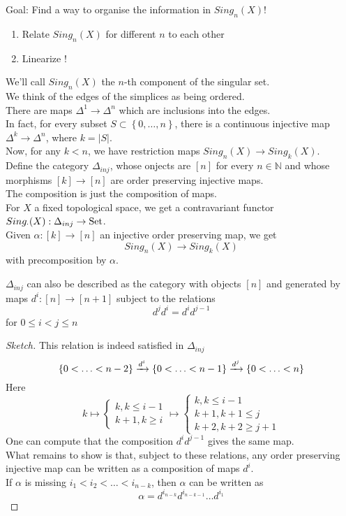 \documentclass[../main.tex]{subfiles}
\begin{document}
Goal: Find a way to organise the information in $Sing_n( X) $!
\begin{enumerate}
\item Relate $Sing_n( X) $ for different $n$ to each other
\item Linearize !
\end{enumerate}
We'll call $Sing_n( X) $ the $n$-th component of the singular set.\\
We think of the edges of the simplices as being ordered.\\
There are maps $\Delta^{1}\to \Delta^{n}$ which are inclusions into the edges.\\
In fact, for every subset $S \subset \left\{ 0,\ldots, n \right\} $, there is a continuous injective map $\Delta^{k}\to \Delta^{n}$, where $k = |S|$.\\
Now, for any $k< n$, we have restriction maps $Sing_n( X) \to Sing_k( X) $.\\
Define the category $\Delta_{inj} $, whose onjects are $ [ n] $ for every $n \in \mathbb{N}$ and whose morphisms $[k] \to [ n] $ are order preserving injective maps.\\
The composition is just the composition of maps.\\
For $X$ a fixed topological space, we get a contravariant functor $Sing_{ \cdot} ( X) : \Delta_{inj} \to \operatorname{Set}$.\\
Given $\alpha: [ k] \to [ n] $ an injective order preserving map, we get 
\[ 
Sing_n( X) \to Sing_k( X) 
\]
with precomposition by $\alpha$.
\begin{lemma}
	$\Delta_{inj} $ can also be described as the category with objects $ [ n] $ and generated by maps $d^{i}:[n] \to [ n+1] $ subject to the relations
	\[ 
	d^{j}d^{i}= d^{i}d^{j-1}
	\]
	for $0 \leq i < j \leq n$ 
\end{lemma}
\begin{proof}[Sketch]
This relation is indeed satisfied in $\Delta_{inj} $ 
\[ 
\left\{ 0< \ldots <n-2 \right\} \xrightarrow{ d^{i} } \left\{ 0< \ldots<n-1 \right\} \xrightarrow{ d^{j}  }\left\{ 0<\ldots<n \right\} 
\]
Here
\[ 
k \mapsto
\begin{cases}
k, k \leq i-1\\
k+1, k \geq i
\end{cases}
\mapsto
\begin{cases}
k, k \leq i-1\\
k+1, k+1 \leq j\\
k+2, k+2 \geq j+1
\end{cases}
\]
One can compute that the composition $d^{i}d^{j-1}$ gives the same map.\\
What remains to show is that, subject to these relations, any order preserving injective map can be written as a composition of maps $d^{i}$.\\
If $\alpha$ is missing $ i_1< i_2< \ldots< i_{n-k} $, then $\alpha$ can be written as
\[ 
\alpha= d^{i_{n-k } } d^{i_{n-k-1}}\ldots d^{i_1}
\]
\end{proof}
\end{document}

